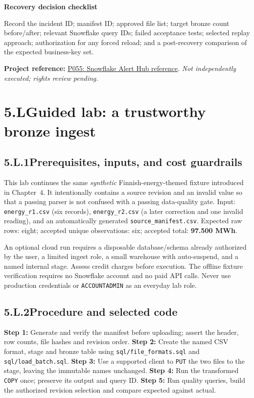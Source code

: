 \documentclass[11pt,twoside]{article}
\newcommand{\topic}[2]{\subsection*{#1\quad #2}}
\newcommand{\repo}[2]{\par\begingroup\fontsize{8.0}{9.6}\selectfont\sffamily\color{inkgray}\textbf{Project reference:} \href{#2}{#1}. \textit{Not independently executed; rights review pending.}\par\endgroup}
\begin{document}
\begin{whitebox}\textbf{Recovery decision checklist}\par
Record the incident ID; manifest ID; approved file list; target bronze count before/after; relevant Snowflake query IDs; failed acceptance tests; selected replay approach; authorization for any forced reload; and a post-recovery comparison of the expected business-key set.\end{whitebox}
\repo{P055: Snowflake Alert Hub reference}{https://github.com/Snowflake-Labs/sfguide-alert-hub}
\newpage
\section*{5.L\quad Guided lab: a trustworthy bronze ingest}
\topic{5.L.1}{Prerequisites, inputs, and cost guardrails}
This lab continues the same \emph{synthetic} Finnish-energy-themed fixture introduced in Chapter~4. It intentionally contains a source revision and an invalid value so that a passing parser is not confused with a passing data-quality gate. Input: \texttt{energy\_r1.csv} (six records), \texttt{energy\_r2.csv} (a later correction and one invalid reading), and an automatically generated \texttt{source\_manifest.csv}. Expected raw rows: eight; accepted unique observations: six; accepted total: \textbf{97.500 MWh}.

An optional cloud run requires a disposable database/schema already authorized by the user, a limited ingest role, a small warehouse with auto-suspend, and a named internal stage. Assess credit charges before execution. The offline fixture verification requires no Snowflake account and no paid API calls. Never use production credentials or \texttt{ACCOUNTADMIN} as an everyday lab role.

\topic{5.L.2}{Procedure and selected code}
\textbf{Step 1:} Generate and verify the manifest before uploading; assert the header, row counts, file hashes and revision order. \textbf{Step 2:} Create the named CSV format, stage and bronze table using \texttt{sql/file\_formats.sql} and \texttt{sql/load\_batch.sql}. \textbf{Step 3:} Use a supported client to \texttt{PUT} the two files to the stage, leaving the immutable names unchanged. \textbf{Step 4:} Run the transformed \texttt{COPY} once; preserve its output and query ID. \textbf{Step 5:} Run quality queries, build the authorized revision selection and compare expected against actual.
\end{document}
